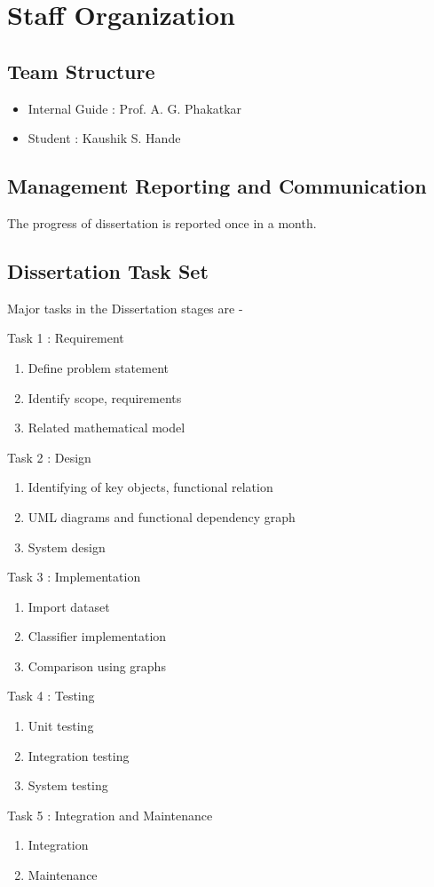 \documentclass[oneside,a4paper,12pt]{pictreport}
\begin{document}
\section{Staff Organization}

\subsection{Team Structure}
\begin{itemize}
    \item Internal Guide : Prof. A. G. Phakatkar
    \item Student : Kaushik S. Hande 
\end{itemize}

\subsection{Management Reporting and Communication}
The progress of dissertation is reported once in a month.
\subsection{Dissertation Task Set}


Major tasks in the Dissertation stages are - 
	
				
				\noindent Task 1 : Requirement
					\begin{enumerate}
						\item Define problem statement
						\item Identify scope, requirements
						\item Related mathematical model
					\end{enumerate}
				Task 2 : Design
					\begin{enumerate}
						\item Identifying of key objects, functional relation
						\item UML diagrams and functional dependency graph
						\item System design
					\end{enumerate}
				Task 3 : Implementation
				\begin{enumerate}
						\item Import dataset
						\item Classifier implementation
						\item Comparison using graphs
					\end{enumerate}
				Task 4 : Testing
					\begin{enumerate}
						\item Unit testing
						\item Integration testing
						\item System testing
					\end{enumerate}
				Task 5 : Integration and Maintenance
					\begin{enumerate}
						\item Integration
						\item Maintenance
					\end{enumerate}
\end{document}
